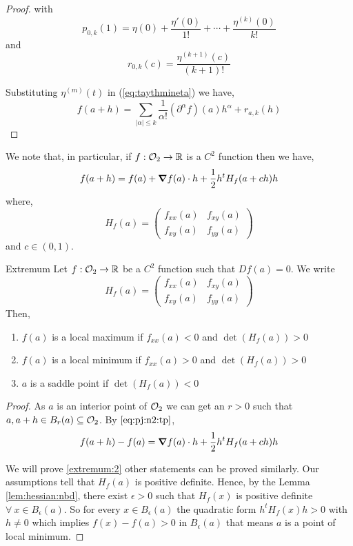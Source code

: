 \documentclass[../Analysis-3.tex]{subfiles}
\begin{document}
\begin{proof}
  with \begin{equation}
    p_{0,k}(1) = \eta(0) + \frac{\eta '(0)}{1!} + \cdots + \frac{\eta^{(k)}(0)}{k!}
  \end{equation} and
  \begin{equation}
    r_{0,k} (c) = \frac{\eta^{(k+1)}(c)}{(k+1)!}
  \end{equation}

  Substituting $\eta^{(m)}(t)$ in (\ref{eq:taythmineta}) we have,
  \[ f(a+h) = \sum_{| \alpha | \leq k } \frac{1}{\alpha !} ({\partial}^{\alpha} f ) (a) h^{\alpha} + r_{a,k} (h) \]
\end{proof}

We note that, in particular, if \( f: \mathcal{O}_{2} \to \mathbb{R} \) is a \( C^2 \) function then we have,
\begin{equation}\label{eq:pj:n2:tp}
  f(a+h) = f(a) + \grad f(a)\cdot h + \frac{1}{2}h^t H_f(a+ch)h
\end{equation} where,
\[ H_f(a) = \begin{pmatrix}
    f_{xx}(a) & f_{xy}(a) \\
    f_{xy}(a) & f_{yy}(a)
  \end{pmatrix} \]
and \( c \in (0,1) \).

\begin{Thm}{Extremum}{}
  Let $f : \mathcal{O}_{2} \to \mathbb{R}$ be a $C^2$ function such that $Df(a) = 0$. We write \[ H_f(a) =  \begin{pmatrix}
      f_{xx}(a) & f_{xy}(a) \\
      f_{xy}(a) & f_{yy}(a)
    \end{pmatrix} \]
  Then, \begin{enumerate}[label=(\roman*)]
    \item $f(a)$ is a local maximum if $f_{xx} (a) < 0$ and $\det (H_f(a)) > 0$
    \item $f(a)$ is a local minimum if $f_{xx} (a) > 0$ and $\det (H_f(a)) > 0$ \label{extremum:2}
    \item $a$ is a saddle point if $\det (H_f(a)) < 0$
  \end{enumerate}
\end{Thm}

\begin{proof}
  As $ a $ is an interior point of $ \mathcal{O}_{2} $ we can get an $ r > 0 $ such that $ a, a+h \in B_r(a) \subseteq \mathcal{O}_{2}$. By $\eqref{eq:pj:n2:tp}$, \[ f(a+h) - f(a) = \grad f(a) \cdot h + \frac{1}{2}h^t H_f(a+ch)h \]

  We will prove \ref{extremum:2} other statements can be proved similarly. Our assumptions tell that $H_f(a)$ is positive definite. Hence, by the Lemma \ref{lem:hessian:nbd}, there exist $ \epsilon > 0 $ such that $H_f(x)$ is positive definite $\forall\ x \in B_{\epsilon}(a)$. So for every $ x \in B_{\epsilon}(a) $ the quadratic form $ h^t H_f(x) h > 0 $ with $ h \neq 0 $ which implies $ f(x) - f(a) > 0 $ in $ B_{\epsilon}(a) $ that means $a$ is a point of local minimum.
\end{proof}
\end{document}
